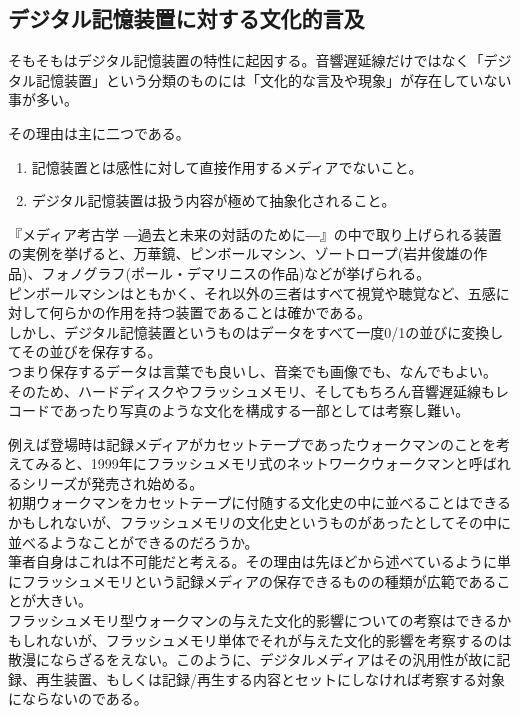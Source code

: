 \documentclass[a4paper,report]{jsbook}
\begin{document}
\subsection{デジタル記憶装置に対する文化的言及}\label{ux30c7ux30b8ux30bfux30ebux8a18ux61b6ux88c5ux7f6eux306bux5bfeux3059ux308bux6587ux5316ux7684ux8a00ux53ca}

そもそもはデジタル記憶装置の特性に起因する。音響遅延線だけではなく「デジタル記憶装置」という分類のものには「文化的な言及や現象」が存在していない事が多い。

その理由は主に二つである。

\begin{enumerate}
\def\labelenumi{\arabic{enumi}.}
\tightlist
\item
  記憶装置とは感性に対して直接作用するメディアでないこと。
\item
  デジタル記憶装置は扱う内容が極めて抽象化されること。
\end{enumerate}

『メディア考古学
―過去と未来の対話のために―』の中で取り上げられる装置の実例を挙げると、万華鏡、ピンボールマシン、ゾートロープ(岩井俊雄の作品)、フォノグラフ(ポール・デマリニスの作品)などが挙げられる。\\
ピンボールマシンはともかく、それ以外の三者はすべて視覚や聴覚など、五感に対して何らかの作用を持つ装置であることは確かである。\\
しかし、デジタル記憶装置というものはデータをすべて一度0/1の並びに変換してその並びを保存する。\\
つまり保存するデータは言葉でも良いし、音楽でも画像でも、なんでもよい。\\
そのため、ハードディスクやフラッシュメモリ、そしてもちろん音響遅延線もレコードであったり写真のような文化を構成する一部としては考察し難い。

例えば登場時は記録メディアがカセットテープであったウォークマンのことを考えてみると、1999年にフラッシュメモリ式のネットワークウォークマンと呼ばれるシリーズが発売され始める。\\
初期ウォークマンをカセットテープに付随する文化史の中に並べることはできるかもしれないが、フラッシュメモリの文化史というものがあったとしてその中に並べるようなことができるのだろうか。\\
筆者自身はこれは不可能だと考える。その理由は先ほどから述べているように単にフラッシュメモリという記録メディアの保存できるものの種類が広範であることが大きい。\\
フラッシュメモリ型ウォークマンの与えた文化的影響についての考察はできるかもしれないが、フラッシュメモリ単体でそれが与えた文化的影響を考察するのは散漫にならざるをえない。このように、デジタルメディアはその汎用性が故に記録、再生装置、もしくは記録/再生する内容とセットにしなければ考察する対象にならないのである。
\end{document}
